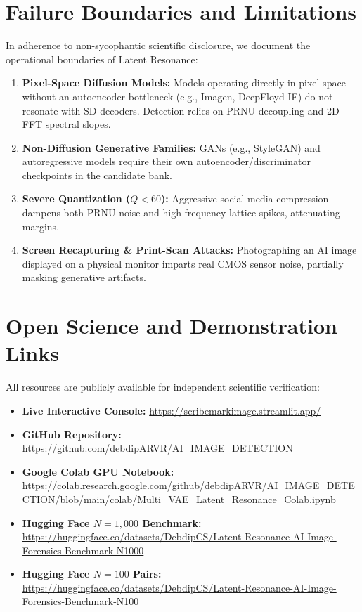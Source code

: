 \documentclass[letterpaper]{article}
\begin{document}
\section{Failure Boundaries and Limitations}
\label{sec:limitations}

In adherence to non-sycophantic scientific disclosure, we document the operational boundaries of Latent Resonance:
\begin{enumerate}
    \item \textbf{Pixel-Space Diffusion Models:} Models operating directly in pixel space without an autoencoder bottleneck (e.g., Imagen, DeepFloyd IF) do not resonate with SD decoders. Detection relies on PRNU decoupling and 2D-FFT spectral slopes.
    \item \textbf{Non-Diffusion Generative Families:} GANs (e.g., StyleGAN) and autoregressive models require their own autoencoder/discriminator checkpoints in the candidate bank.
    \item \textbf{Severe Quantization ($Q < 60$):} Aggressive social media compression dampens both PRNU noise and high-frequency lattice spikes, attenuating margins.
    \item \textbf{Screen Recapturing \& Print-Scan Attacks:} Photographing an AI image displayed on a physical monitor imparts real CMOS sensor noise, partially masking generative artifacts.
\end{enumerate}

\section{Open Science and Demonstration Links}
\label{sec:links}

All resources are publicly available for independent scientific verification:
\begin{itemize}
    \item \textbf{Live Interactive Console:} \url{https://scribemarkimage.streamlit.app/}
    \item \textbf{GitHub Repository:} \url{https://github.com/debdipARVR/AI_IMAGE_DETECTION}
    \item \textbf{Google Colab GPU Notebook:} \url{https://colab.research.google.com/github/debdipARVR/AI_IMAGE_DETECTION/blob/main/colab/Multi_VAE_Latent_Resonance_Colab.ipynb}
    \item \textbf{Hugging Face $N=1,000$ Benchmark:} \url{https://huggingface.co/datasets/DebdipCS/Latent-Resonance-AI-Image-Forensics-Benchmark-N1000}
    \item \textbf{Hugging Face $N=100$ Pairs:} \url{https://huggingface.co/datasets/DebdipCS/Latent-Resonance-AI-Image-Forensics-Benchmark-N100}
\end{itemize}



\end{document}
